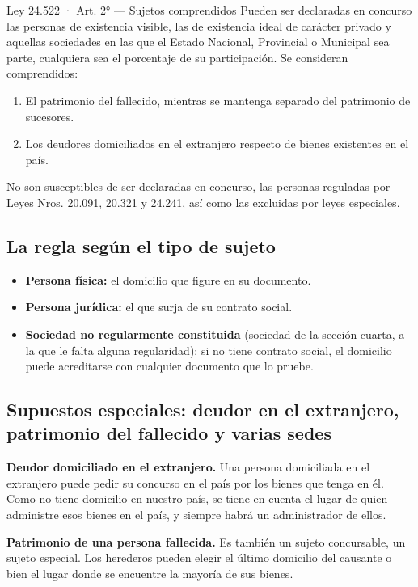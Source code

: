 \documentclass[12pt,oneside]{book}
\begin{document}
\begin{norma}{Ley 24.522 · Art. 2° — Sujetos comprendidos}
Pueden ser declaradas en concurso las personas de existencia visible, las de existencia ideal de carácter privado y aquellas sociedades en las que el Estado Nacional, Provincial o Municipal sea parte, cualquiera sea el porcentaje de su participación. Se consideran comprendidos:
\begin{enumerate}[label=\arabic*),leftmargin=*]
    \item El patrimonio del fallecido, mientras se mantenga separado del patrimonio de sucesores.
    \item Los deudores domiciliados en el extranjero respecto de bienes existentes en el país.
\end{enumerate}
No son susceptibles de ser declaradas en concurso, las personas reguladas por Leyes Nros. 20.091, 20.321 y 24.241, así como las excluidas por leyes especiales.
\end{norma}

\subsection{La regla según el tipo de sujeto}

\begin{itemize}
    \item \textbf{Persona física:} el domicilio que figure en su documento.
    \item \textbf{Persona jurídica:} el que surja de su contrato social.
    \item \textbf{Sociedad no regularmente constituida} (sociedad de la sección cuarta, a la que le falta alguna regularidad): si no tiene contrato social, el domicilio puede acreditarse con cualquier documento que lo pruebe.
\end{itemize}

\subsection{Supuestos especiales: deudor en el extranjero, patrimonio del fallecido y varias sedes}

\textbf{Deudor domiciliado en el extranjero.} Una persona domiciliada en el extranjero puede pedir su concurso en el país por los bienes que tenga en él. Como no tiene domicilio en nuestro país, se tiene en cuenta el lugar de quien administre esos bienes en el país, y siempre habrá un administrador de ellos.

\textbf{Patrimonio de una persona fallecida.} Es también un sujeto concursable, un sujeto especial. Los herederos pueden elegir el último domicilio del causante o bien el lugar donde se encuentre la mayoría de sus bienes.
\end{document}
